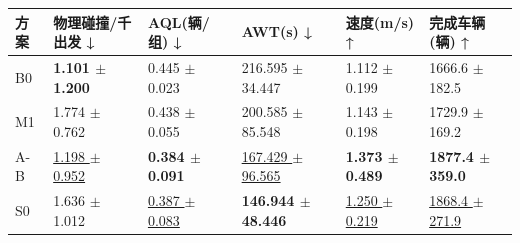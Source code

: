 \begin{tabular}{llllll}
\toprule
方案 & 物理碰撞/千出发 ↓ & AQL(辆/组) ↓ & AWT(s) ↓ & 速度(m/s) ↑ & 完成车辆(辆) ↑ \\
\midrule
B0 & \textbf{1.101 $\pm$ 1.200} & 0.445 $\pm$ 0.023 & 216.595 $\pm$ 34.447 & 1.112 $\pm$ 0.199 & 1666.6 $\pm$ 182.5 \\
M1 & 1.774 $\pm$ 0.762 & 0.438 $\pm$ 0.055 & 200.585 $\pm$ 85.548 & 1.143 $\pm$ 0.198 & 1729.9 $\pm$ 169.2 \\
A-B & \underline{1.198 $\pm$ 0.952} & \textbf{0.384 $\pm$ 0.091} & \underline{167.429 $\pm$ 96.565} & \textbf{1.373 $\pm$ 0.489} & \textbf{1877.4 $\pm$ 359.0} \\
S0 & 1.636 $\pm$ 1.012 & \underline{0.387 $\pm$ 0.083} & \textbf{146.944 $\pm$ 48.446} & \underline{1.250 $\pm$ 0.219} & \underline{1868.4 $\pm$ 271.9} \\
\bottomrule
\end{tabular}